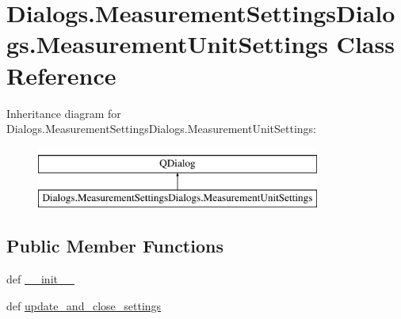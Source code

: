 \hypertarget{classDialogs_1_1MeasurementSettingsDialogs_1_1MeasurementUnitSettings}{\section{Dialogs.\-Measurement\-Settings\-Dialogs.\-Measurement\-Unit\-Settings Class Reference}
\label{classDialogs_1_1MeasurementSettingsDialogs_1_1MeasurementUnitSettings}
}
Inheritance diagram for Dialogs.\-Measurement\-Settings\-Dialogs.\-Measurement\-Unit\-Settings\-:\begin{figure}[H]
\begin{center}
\leavevmode
\includegraphics[height=2.000000cm]{classDialogs_1_1MeasurementSettingsDialogs_1_1MeasurementUnitSettings}
\end{center}
\end{figure}
\subsection*{Public Member Functions}
\begin{DoxyCompactItemize}
\item 
def \hyperlink{classDialogs_1_1MeasurementSettingsDialogs_1_1MeasurementUnitSettings_aaa4654df0caa128cb479935495053e5b}{\-\_\-\-\_\-init\-\_\-\-\_\-}
\item 
def \hyperlink{classDialogs_1_1MeasurementSettingsDialogs_1_1MeasurementUnitSettings_a3b51ca16f364d8eb3b38b2c69ca052eb}{update\-\_\-and\-\_\-close\-\_\-settings}
\end{DoxyCompactItemize}

